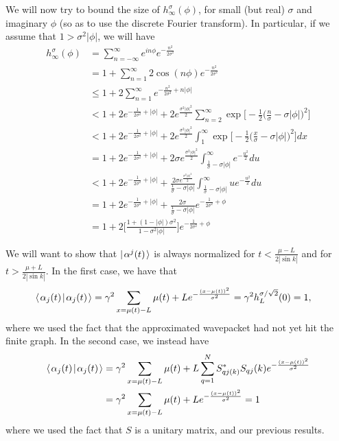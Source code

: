 \documentclass[../thesis-main/thesis-main]{subfiles}
\begin{document}
We will now try to bound the size of $h_\infty^\sigma(\phi)$, for small (but real) $\sigma$ and imaginary $\phi$ (so as to use the discrete Fourier transform).  In particular, if we assume that $1 > \sigma^2 |\phi|$, we will have
\begin{align}
  h_\infty^\sigma(\phi) &= \sum_{n=-\infty}^\infty e^{i n \phi} e^{- \frac{n^2}{2\sigma^2}}\\
    &= 1 + \sum_{n=1}^\infty 2 \cos(n \phi) e^{-\frac{n^2}{2\sigma^2}}\\
    &\leq 1 + 2 \sum_{n=1}^\infty e^{ -\frac{n^2}{2\sigma^2} + n |\phi|}\\
    &< 1 + 2 e^{- \frac{1}{2\sigma^2} + |\phi|} + 2 e^{ \frac{\sigma^2|\phi|^2 }{2}}\sum_{n=2}^\infty \exp\Big[ -\frac{1}{2}\Big(\frac{n}{\sigma} - \sigma |\phi|\Big)^2 \Big]\\
    &< 1 + 2 e^{ - \frac{1}{2\sigma^2} + |\phi|} + 2 e^{ \frac{\sigma^2|\phi|^2 }{2}}\int_{1}^\infty  \exp\Big[ -\frac{1}{2}\Big(\frac{x}{\sigma} - \sigma |\phi|\Big)^2 \Big]dx\\
    &= 1 + 2 e^{-\frac{1}{2\sigma^2} + |\phi|} + 2 \sigma e^{ \frac{\sigma^2|\phi|^2 }{2}} \int_{\frac{1}{\sigma} - \sigma|\phi|}^\infty e^{-\frac{u^2}{2}} du\\
    &< 1 + 2 e^{-\frac{1}{2\sigma^2} + |\phi|} + \frac{2 \sigma e^{\frac{\sigma^2|\phi|^2}{2}}}{\frac{1}{\sigma} - \sigma |\phi|} \int_{\frac{1}{\sigma} - \sigma|\phi|}^\infty u e^{-\frac{u^2}{2}} du\\
    &= 1 + 2 e^{-\frac{1}{2\sigma^2} + |\phi|} + \frac{2 \sigma}{\frac{1}{\sigma} - \sigma |\phi|} e^{-\frac{1}{2\sigma^2} + \phi}\\
    &= 1 + 2 \Bigg[ \frac{ 1 + (1-|\phi|) \sigma^2}{1 - \sigma^2|\phi|}\Bigg]e^{-\frac{1}{2\sigma^2} + \phi} \label{eq:h_bound}
\end{align}


We will want to show that $|\mspace{2mu} \alpha^j(t) \mspace{2mu} \rangle$ is always normalized for $t < \frac{\mu - L}{2|\sin k|}$ and for $t > \frac{\mu + L}{2|\sin k|}$.  In the first case, we have that 
\begin{align}
   \langle\mspace{2mu} \alpha_j(t) \mspace{2mu} | \mspace{2mu} \alpha_j(t)\mspace{2mu} \rangle &= \gamma^2 \sum_{x = \mu(t) - L}{\mu(t) + L} e^{ -\frac{(x-\mu(t))^2}{\sigma^2}} = \gamma^2 h_{L}^{\sigma/\sqrt{2}} (0) = 1,
\end{align}
where we used the fact that the approximated wavepacket had not yet hit the finite graph.  In the second case, we instead have
\begin{align}
  \langle\mspace{2mu} \alpha_j(t) \mspace{2mu} | \mspace{2mu} \alpha_j(t)\mspace{2mu} \rangle &= \gamma^2 \sum_{x = \mu(t) - L}{\mu(t) + L} \sum_{q = 1}^N S_{qj(k)}^*S_{qj}(k) e^{ -\frac{(x-\mu(t))^2}{\sigma^2}} \\
   &= \gamma^2 \sum_{x = \mu(t) - L}{\mu(t) + L}  e^{ -\frac{(x-\mu(t))^2}{\sigma^2}} = 1
\end{align}
where we used the fact that $S$ is a unitary matrix, and our previous results.  
\end{document}
